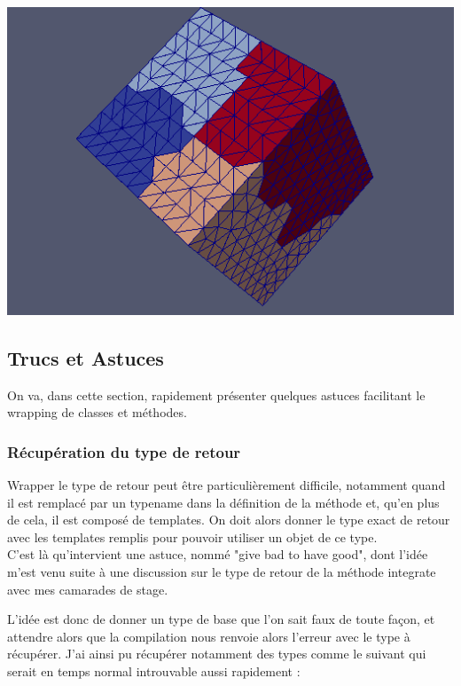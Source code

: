 \documentclass[french,12pt]{article}
\begin{document}
\includegraphics[scale=0.60]{MPI.png} 

\subsection{Trucs et Astuces}

On va, dans cette section, rapidement présenter quelques astuces facilitant le wrapping de classes et méthodes.

\subsubsection{Récupération du type de retour}

Wrapper le type de retour peut être particulièrement difficile, notamment quand il est remplacé par un typename dans la définition de la méthode et, qu'en plus de cela, il est composé de templates. On doit alors donner le type exact de retour avec les templates remplis pour pouvoir utiliser un objet de ce type.\\

C'est là qu'intervient une astuce, nommé "give bad to have good", dont l'idée m'est venu suite à une discussion sur le type de retour de la méthode integrate avec mes camarades de stage.

L'idée est donc de donner un type de base que l'on sait faux de toute façon, et attendre alors que la compilation nous renvoie alors l'erreur avec le type à récupérer. J'ai ainsi pu récupérer notamment des types comme le suivant qui serait en temps normal introuvable aussi rapidement : 
\end{document}
